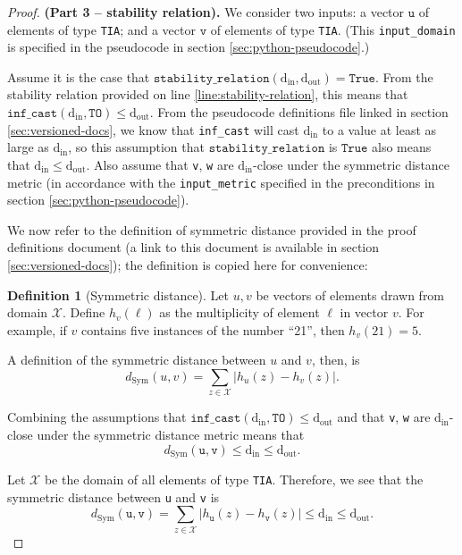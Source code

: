 \documentclass[12pt,letterpaper]{article}
\newcommand{\din}{\mathrm{d_{in}}}
\newcommand{\dout}{\mathrm{d_{out}}}
\newcommand{\True}{\texttt{True}}
\theoremstyle{definition}
\newtheorem{definition}[theorem]{Definition}
\begin{document}
\begin{proof} \textbf{(Part 3 -- stability relation).} We consider two inputs: a vector $\texttt{u}$ of elements of type \texttt{TIA}; and a vector $\texttt{v}$ of elements of type \texttt{TIA}. (This \texttt{input\_domain} is specified in the pseudocode in section \ref{sec:python-pseudocode}.)

Assume it is the case that $\texttt{stability\_relation}(\din, \dout) = \True$. From  the stability relation provided on line \ref{line:stability-relation}, this means that $\texttt{inf\_cast}(\din, \texttt{TO}) \leq \dout$. From the pseudocode definitions file linked in section \ref{sec:versioned-docs}, we know that \texttt{inf\_cast} will cast $\din$ to a value at least as large as $\din$, so this assumption that $\texttt{stability\_relation}$ is $\True$ also means that $\din \leq \dout$. Also assume that \texttt{v}, \texttt{w} are $\din$-close under the symmetric distance metric (in accordance with the \texttt{input\_metric} specified in the preconditions in section \ref{sec:python-pseudocode}).

We now refer to the definition of symmetric distance provided in the proof definitions document (a link to this document is available in section \ref{sec:versioned-docs}); the definition is copied here for convenience:

\begin{definition}[Symmetric distance]
\label{defn:symm-dist}
Let $u,v$ be vectors of elements drawn from domain $\mathcal{X}$. Define $h_v(\ell)$ as the multiplicity of element $\ell$ in vector $v$. For example, if $v$ contains five instances of the number ``21'', then $h_v(21) = 5$.

A definition of the symmetric distance between $u$ and $v$, then, is $$d_{\text{Sym}}(u,v) = \sum_{z\in \mathcal{X}} |h_u(z) - h_v(z)|.$$
\end{definition}

Combining the assumptions that $\texttt{inf\_cast}(\din, \texttt{TO}) \leq \dout$ and that \texttt{v}, \texttt{w} are $\din$-close under the symmetric distance metric means that
\begin{equation}
    d_\text{Sym}(\texttt{u}, \texttt{v})
    \leq \din \leq \dout.
\end{equation}

Let $\mathcal{X}$ be the domain of all elements of type \texttt{TIA}. Therefore, we see that the symmetric distance  between \texttt{u} and \texttt{v} is 
\begin{equation}
\label{eq:expand-dymm-dist}
    d_\text{Sym}(\texttt{u}, \texttt{v}) = \sum_{z\in \mathcal{X}} |h_{\texttt{u}}(z) - h_{\texttt{v}}(z)| \leq \din \leq \dout.
\end{equation}


\end{proof}
\end{document}
